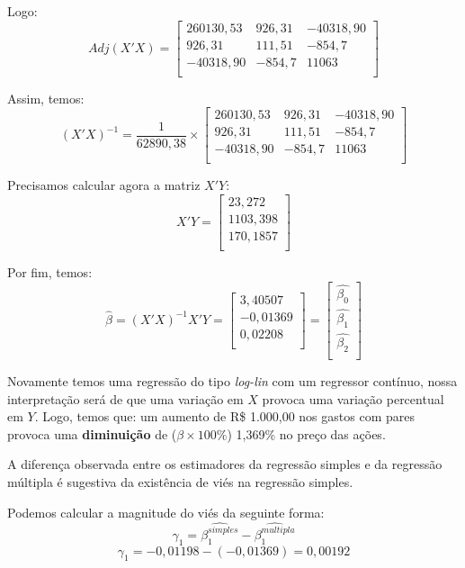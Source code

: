 \documentclass[]{ufpe-exercises}
\begin{document}
\begin{questions}
\begin{parts}
\begin{solution}
			Logo:
			\[
				Adj(X'X) =
				\begin{bmatrix}
					260130,53 & 926,31 & -40318,90 \\
					926,31    & 111,51 & -854,7    \\
					-40318,90 & -854,7 & 11063     \\
				\end{bmatrix}
			\]

			Assim, temos:
			\[
				(X'X)^{-1} = \frac{1}{62890,38} \times
				\begin{bmatrix}
					260130,53 & 926,31 & -40318,90 \\
					926,31    & 111,51 & -854,7    \\
					-40318,90 & -854,7 & 11063     \\
				\end{bmatrix}
			\]

			Precisamos calcular agora a matriz \(X'Y\):
			\[
				X'Y =
				\begin{bmatrix}
					23,272   \\
					1103,398 \\
					170,1857 \\
				\end{bmatrix}
			\]

			Por fim, temos:
			\[
				\hat{\beta} = (X'X)^{-1}X'Y =
				\begin{bmatrix}
					3,40507  \\
					-0,01369 \\
					0,02208  \\
				\end{bmatrix} =
				\begin{bmatrix}
					\hat{\beta_{0}} \\
					\hat{\beta_{1}} \\
					\hat{\beta_{2}} \\
				\end{bmatrix}
			\]

			Novamente temos uma regressão do tipo \textit{log-lin} com um regressor contínuo, nossa interpretação será de que uma variação em \(X\) provoca uma variação percentual em \(Y\). Logo, temos que: um aumento de R\$ 1.000,00 nos gastos com pares provoca uma \textbf{diminuição} de (\(\beta \times 100\%\)) 1,369\% no preço das ações.

			A diferença observada entre os estimadores da regressão simples e da regressão múltipla é sugestiva da existência de viés na regressão simples.

			Podemos calcular a magnitude do viés da seguinte forma:
			\[ \gamma_{1} = \widehat{\beta_{1}^{simples}} - \widehat{\beta_{1}^{multipla}} \]
			\[ \gamma_{1} = -0,01198 - (-0,01369) = 0,00192\]


\end{solution}
\end{parts}
\end{questions}
\end{document}
